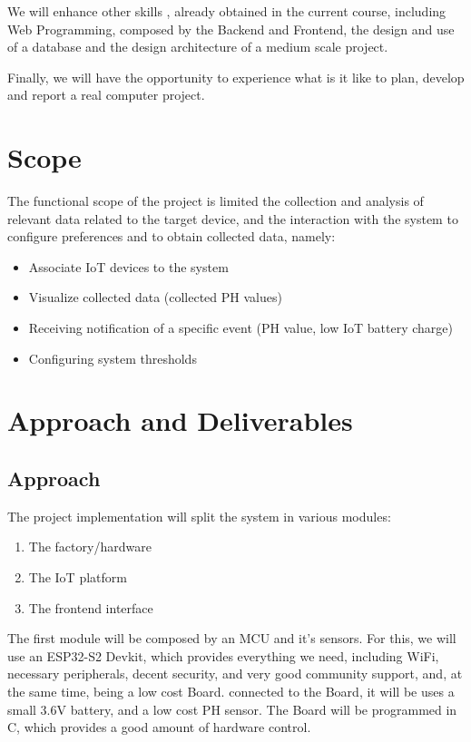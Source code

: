 \documentclass[a4paper,twoside,11pt]{article}
\begin{document}
We will enhance other skills , already obtained in the current course, including Web Programming, composed by the Backend and Frontend, the design and use of a database and the design architecture of a medium scale project. 

Finally, we will have the opportunity to experience what is it like to plan, develop and report a real computer project.

\section*{Scope}
The functional scope of the project is limited the collection and analysis of relevant data related to the target device, and the interaction with the system to configure preferences and to obtain collected data, namely:
\begin{itemize}
    \item Associate IoT devices to the system
    \item Visualize collected data (collected PH values)
    \item Receiving notification of a specific event (PH value, low IoT battery charge)
    \item Configuring system thresholds
\end{itemize}

\section*{Approach and Deliverables}
\subsection{Approach}
The project implementation will split the system in various modules:
\begin{enumerate}
    \item The factory/hardware
    \item The IoT platform
    \item The frontend interface
\end{enumerate}
The first module will be composed by an MCU and it's sensors. For this, we will use an ESP32-S2 Devkit, which provides everything we need, including WiFi, necessary peripherals, decent security, and very good community support, and, at the same time, being a low cost Board. connected to the Board, it will be uses a small 3.6V battery, and a low cost PH sensor. The Board will be programmed in C, which provides a good amount of hardware control.
\end{document}
